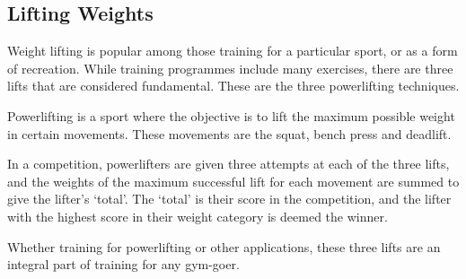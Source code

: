 \subsection{Lifting Weights}

Weight lifting is popular among those training for a particular sport, or as a form of recreation. While training programmes include many exercises, there are three lifts that are considered fundamental. These are the three powerlifting techniques.

Powerlifting is a sport where the objective is to lift the maximum possible weight in certain movements. These movements are the squat, bench press and deadlift.

In a competition, powerlifters are given three attempts at each of the three lifts, and the weights of the maximum successful lift for each movement are summed to give the lifter’s ‘total’. The ‘total’ is their score in the competition, and the lifter with the highest score in their weight category is deemed the winner.

Whether training for powerlifting or other applications, these three lifts are an integral part of training for any gym-goer.





